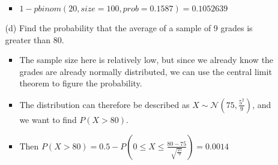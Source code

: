 \documentclass{article}
\begin{document}
\begin{enumerate}
\begin{itemize}
        \begin{itemize}
        \item $1 - pbinom(20, size=100, prob=0.1587) = 0.1052639$
        \end{itemize}
    \item [(d)] Find the probability that the average of a sample of 9 grades is greater than 80.
        \begin{itemize}
        \item The sample size here is relatively low, but since we already know the grades are already normally distributed, we can use the central limit theorem to figure the probability.
        \item The distribution can therefore be described as $X \sim \mathcal{N}(75, \frac{5^2}{9})$, and we want to find $P(X > 80)$.
        \item Then $P(X > 80) = 0.5 - P(0 \leq X \leq \frac{80 - 75}{\sqrt{\frac{25}{9}}}) = 0.0014$
        \end{itemize}
    \end{itemize}


\end{enumerate}
\end{document}
